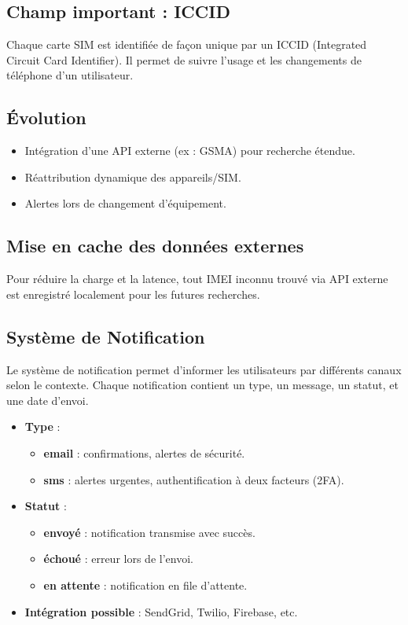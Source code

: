 \documentclass[a4paper,12pt]{article}
\begin{document}
\subsection{Champ important : ICCID}
Chaque carte SIM est identifiée de façon unique par un ICCID (Integrated Circuit Card Identifier). Il permet de suivre l’usage et les changements de téléphone d’un utilisateur.

\subsection{Évolution}
\begin{itemize}
    \item Intégration d’une API externe (ex : GSMA) pour recherche étendue.
    \item Réattribution dynamique des appareils/SIM.
    \item Alertes lors de changement d’équipement.
\end{itemize}

\subsection{Mise en cache des données externes}
Pour réduire la charge et la latence, tout IMEI inconnu trouvé via API externe est enregistré localement pour les futures recherches.

\subsection{Système de Notification}

Le système de notification permet d’informer les utilisateurs par différents canaux selon le contexte. Chaque notification contient un type, un message, un statut, et une date d’envoi.

\begin{itemize}
    \item \textbf{Type} : 
    \begin{itemize}
        \item \textbf{email} : confirmations, alertes de sécurité.
        \item \textbf{sms} : alertes urgentes, authentification à deux facteurs (2FA).
    \end{itemize}

    \item \textbf{Statut} :
    \begin{itemize}
        \item \textbf{envoyé} : notification transmise avec succès.
        \item \textbf{échoué} : erreur lors de l’envoi.
        \item \textbf{en attente} : notification en file d’attente.
    \end{itemize}
    
    \item \textbf{Intégration possible} : SendGrid, Twilio, Firebase, etc.
\end{itemize}
\end{document}
